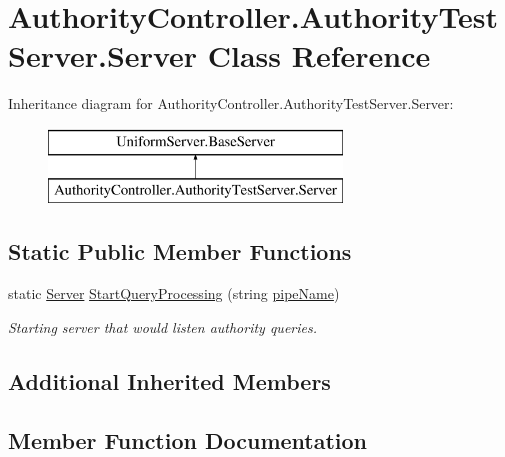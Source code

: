 \hypertarget{class_authority_controller_1_1_authority_test_server_1_1_server}{}\section{Authority\+Controller.\+Authority\+Test\+Server.\+Server Class Reference}
\label{class_authority_controller_1_1_authority_test_server_1_1_server}
Inheritance diagram for Authority\+Controller.\+Authority\+Test\+Server.\+Server\+:\begin{figure}[H]
\begin{center}
\leavevmode
\includegraphics[height=2.000000cm]{da/df0/class_authority_controller_1_1_authority_test_server_1_1_server}
\end{center}
\end{figure}
\subsection*{Static Public Member Functions}
\begin{DoxyCompactItemize}
\item 
static \mbox{\hyperlink{class_authority_controller_1_1_authority_test_server_1_1_server}{Server}} \mbox{\hyperlink{class_authority_controller_1_1_authority_test_server_1_1_server_ab6167aa4233c1cbdd42694d93827e9ac}{Start\+Query\+Processing}} (string \mbox{\hyperlink{class_uniform_server_1_1_base_server_aaa318b3ed503dd8ccf381c9f3a81ecf2}{pipe\+Name}})
\begin{DoxyCompactList}\small\item\em Starting server that would listen authority queries. \end{DoxyCompactList}\end{DoxyCompactItemize}
\subsection*{Additional Inherited Members}


\subsection{Member Function Documentation}
\mbox{\label{class_authority_controller_1_1_authority_test_server_1_1_server_ab6167aa4233c1cbdd42694d93827e9ac}} 

